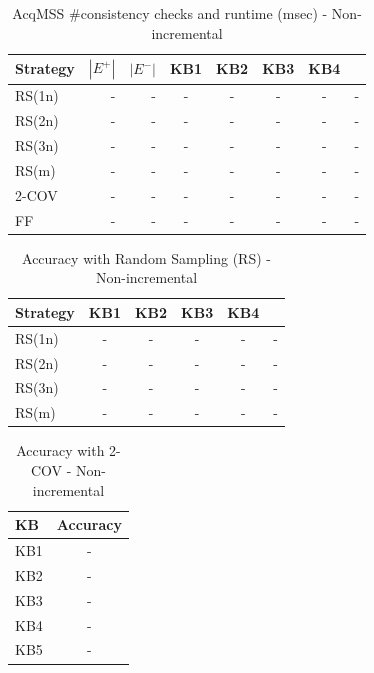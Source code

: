 \begin{table}[htbp]
\centering
\caption{AcqMSS \#consistency checks and runtime (msec) - Non-incremental}
\label{tab:table7_non-incremental}
\begin{tabular}{lrrcccc}
\toprule
Strategy & $|E^+|$ & $|E^-|$ & KB1 & KB2 & KB3 & KB4 \\
\midrule
RS(1n) & - & - & - & - & - & - & - \\
RS(2n) & - & - & - & - & - & - & - \\
RS(3n) & - & - & - & - & - & - & - \\
RS(m) & - & - & - & - & - & - & - \\
2-COV & - & - & - & - & - & - & - \\
FF & - & - & - & - & - & - & - \\
\bottomrule
\end{tabular}
\end{table}

\begin{table}[htbp]
\centering
\caption{Accuracy with Random Sampling (RS) - Non-incremental}
\label{tab:table9_non-incremental}
\begin{tabular}{lcccc}
\toprule
Strategy & KB1 & KB2 & KB3 & KB4 \\
\midrule
RS(1n) & - & - & - & - & - \\
RS(2n) & - & - & - & - & - \\
RS(3n) & - & - & - & - & - \\
RS(m) & - & - & - & - & - \\
\bottomrule
\end{tabular}
\end{table}

\begin{table}[htbp]
\centering
\caption{Accuracy with 2-COV - Non-incremental}
\label{tab:table10_non-incremental}
\begin{tabular}{lc}
\toprule
KB & Accuracy \\
\midrule
KB1 & - \\
KB2 & - \\
KB3 & - \\
KB4 & - \\
KB5 & - \\
\bottomrule
\end{tabular}
\end{table}

